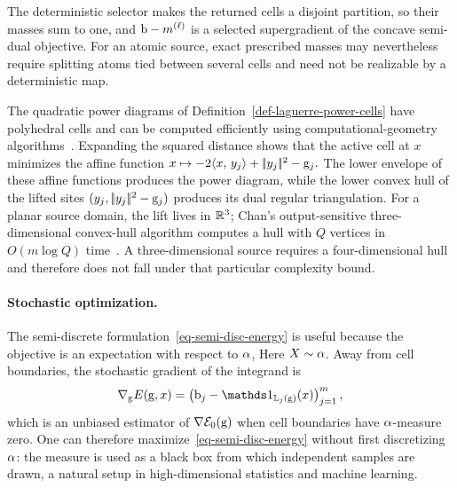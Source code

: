 The deterministic selector makes the returned cells a disjoint partition, so their masses sum to one, and $\mathrm{b}-m^{(\ell)}$ is a selected supergradient of the concave semi-dual objective. For an atomic source, exact prescribed masses may nevertheless require splitting atoms tied between several cells and need not be realizable by a deterministic map.

The quadratic power diagrams of Definition~\ref{def-laguerre-power-cells} have polyhedral cells and can be computed efficiently using computational-geometry algorithms~\cite{aurenhammer1987power,AurenhammerHA98,Merigot11}. Expanding the squared distance shows that the active cell at $x$ minimizes the affine function
\(
x\mapsto -2\langle x,\,y_j\rangle+|\!| y_j |\!|^2-\mathrm{g}_j.
\)
The lower envelope of these affine functions produces the power diagram, while the lower convex hull of the lifted sites $(y_j,|\!| y_j |\!|^2-\mathrm{g}_j)$ produces its dual regular triangulation. For a planar source domain, the lift lives in $\mathbb{R}^3$; Chan's output-sensitive three-dimensional convex-hull algorithm computes a hull with $Q$ vertices in $O(m\log Q)$ time~\cite{chan1996optimal}. A three-dimensional source requires a four-dimensional hull and therefore does not fall under that particular complexity bound.

\paragraph{Stochastic optimization.}

The semi-discrete formulation~\eqref{eq-semi-disc-energy} is useful because the objective is an expectation with respect to $\alpha$,
Here $X\sim\alpha$. Away from cell boundaries, the stochastic gradient of the integrand is
\[
	\nabla_{\gD}E(\gD,x)
	=
	\left(\b_j-\ones_{\Laguerre_j(\gD)}(x)\right)_{j=1}^m,
\]
which is an unbiased estimator of $\nabla\mathcal{E}_0(\mathrm{g})$ when cell boundaries have $\alpha$-measure zero. One can therefore maximize~\eqref{eq-semi-disc-energy} without first discretizing $\alpha$: the measure is used as a black box from which independent samples are drawn, a natural setup in high-dimensional statistics and machine learning.

